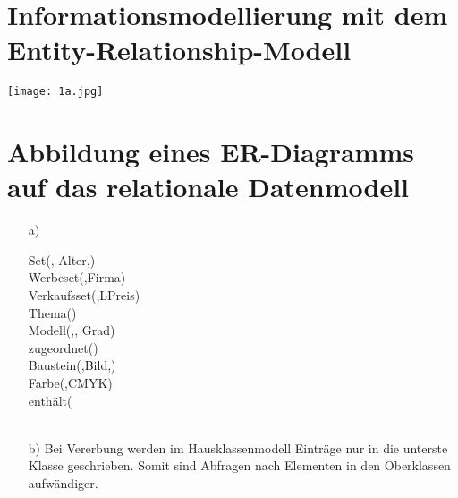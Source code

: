\documentclass[ngerman]{gdb-aufgabenblatt}
\begin{document}
\section{Informationsmodellierung mit dem Entity-Relationship-Modell}

\texttt{[image: 1a.jpg]}
\section{Abbildung eines ER-Diagramms auf das relationale
Datenmodell}
\begin{enumerate}
\item[a)]
\begin{RMSchma}
Set(, Alter,)\\
Werbeset(,Firma)\\
Verkaufsset(,LPreis)\\
Thema()\\ 
Modell(,, Grad)\\
zugeordnet()\\
Baustein(,Bild,)\\
Farbe(,CMYK)\\
enth\"alt(\\\\
\end{RMSchma}
\item[b)]
Bei Vererbung werden im Hausklassenmodell Einträge nur in die unterste Klasse geschrieben. Somit sind Abfragen nach Elementen in den Oberklassen aufwändiger.\\
\end{enumerate}
\end{document}
